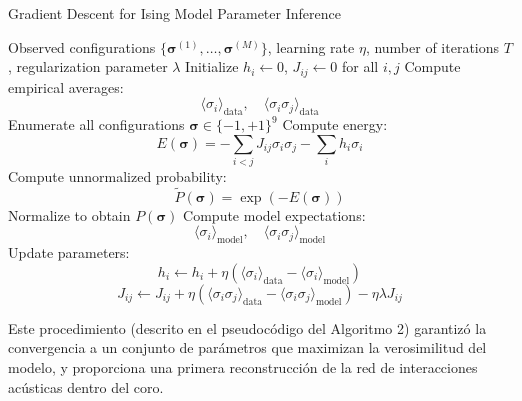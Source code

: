 \begin{algorithm}[H]
    \caption{Gradient Descent for Ising Model Parameter Inference}
    \begin{algorithmic}[1]
    \Require Observed configurations \( \{\boldsymbol{\sigma}^{(1)}, \dots, \boldsymbol{\sigma}^{(M)}\} \), learning rate \( \eta \), number of iterations \( T \), regularization parameter \( \lambda \)
    \State Initialize \( h_i \gets 0 \), \( J_{ij} \gets 0 \) for all \( i, j \)
        \State Compute empirical averages:
            \[ \langle \sigma_i \rangle_{\text{data}}, \quad \langle \sigma_i \sigma_j \rangle_{\text{data}} \]
        \State Enumerate all configurations \( \boldsymbol{\sigma} \in \{-1, +1\}^9 \)
            \State Compute energy: 
                \[ E(\boldsymbol{\sigma}) = -\sum_{i<j} J_{ij} \sigma_i \sigma_j - \sum_i h_i \sigma_i \]
            \State Compute unnormalized probability: 
                \[ \tilde{P}(\boldsymbol{\sigma}) = \exp(-E(\boldsymbol{\sigma})) \]
        \EndFor
        \State Normalize to obtain \( P(\boldsymbol{\sigma}) \)
        \State Compute model expectations:
            \[ \langle \sigma_i \rangle_{\text{model}}, \quad \langle \sigma_i \sigma_j \rangle_{\text{model}} \]
        \State Update parameters:
            \[
            h_i \gets h_i + \eta \left( \langle \sigma_i \rangle_{\text{data}} - \langle \sigma_i \rangle_{\text{model}} \right)
            \]
            \[
            J_{ij} \gets J_{ij} + \eta \left( \langle \sigma_i \sigma_j \rangle_{\text{data}} - \langle \sigma_i \sigma_j \rangle_{\text{model}} \right) - \eta \lambda J_{ij}
            \]
    \EndFor
    \end{algorithmic}
\end{algorithm}

Este procedimiento (descrito en el pseudocódigo del Algoritmo 2) garantizó la convergencia a un conjunto de 
parámetros que maximizan la verosimilitud del modelo, y 
proporciona una primera reconstrucción de la red de 
interacciones acústicas dentro del coro.
